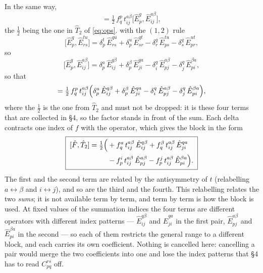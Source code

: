 \documentclass[11pt]{article}
\newcommand{\E}[2]{\hat E^{#1}_{#2}}
\newcommand{\occ}{i}
\newcommand{\vir}{a}
\begin{document}
In the same way,
\begin{equation}
  [\hat F,\hat T_2]
   =\tfrac12\,f^p_q\,t^{\vir\beta}_{\occ j}
     \bigl[\E{q}{p},\E{\vir\beta}{\occ j}\bigr],
\end{equation}
the $\tfrac12$ being the one in $\hat T_2$ of \eqref{eq:ops}.
with the $(1,2)$ rule
\begin{equation}
  \bigl[\E{q}{p},\E{tu}{rs}\bigr]
   =\delta^t_p\,\E{qu}{rs}+\delta^u_p\,\E{qt}{sr}
    -\delta^q_r\,\E{tu}{ps}-\delta^q_s\,\E{ut}{pr},
  \label{eq:c12}
\end{equation}
so
\[
  \bigl[\E{q}{p},\E{\vir\beta}{\occ j}\bigr]
   =\delta^\vir_p\,\E{q\beta}{\occ j}+\delta^\beta_p\,\E{q\vir}{j\occ}
    -\delta^q_\occ\,\E{\vir\beta}{pj}-\delta^q_j\,\E{\beta\vir}{p\occ},
\]
so that
\begin{equation}
  [\hat F,\hat T_2]
   =\tfrac12\,f^p_q\,t^{\vir\beta}_{\occ j}
     \Bigl(\delta^\vir_p\,\E{q\beta}{\occ j}+\delta^\beta_p\,\E{q\vir}{j\occ}
      -\delta^q_\occ\,\E{\vir\beta}{pj}-\delta^q_j\,\E{\beta\vir}{p\occ}\Bigr),
  \label{eq:c12apply}
\end{equation}
where the $\tfrac12$ is the one from $\hat T_2$ and must not be dropped: it is
these four terms that are collected in \S4, so the factor stands in front of
the sum. Each delta contracts one index of $f$ with the operator, which gives
the block in the form
\begin{equation}
  \boxed{\;
  \begin{aligned}
    [\hat F,\hat T_2]=\tfrac12\Bigl(
     &+f^\vir_q\,t^{\vir\beta}_{\occ j}\,\E{q\beta}{\occ j}
      +f^\beta_q\,t^{\vir\beta}_{\occ j}\,\E{q\vir}{j\occ}\\
     &-f^\occ_p\,t^{\vir\beta}_{\occ j}\,\E{\vir\beta}{pj}
      -f^j_p\,t^{\vir\beta}_{\occ j}\,\E{\beta\vir}{p\occ}\Bigr).
  \end{aligned}\;}
  \label{eq:FT2}
\end{equation}
The first and the second term are related by the antisymmetry of $t$
(relabelling $\vir\leftrightarrow\beta$ and $\occ\leftrightarrow j$), and so
are the third and the fourth. This relabelling relates the two \emph{sums}; it
is not available term by term, and term by term is how the block is used. At
fixed values of the summation indices the four terms are different operators
with different index patterns --- $\E{q\beta}{ij}$ and $\E{qa}{ji}$ in the first
pair, $\E{\vir\beta}{pj}$ and $\E{\beta\vir}{pi}$ in the second --- so each of
them restricts the general range to a different block, and each carries its own
coefficient. Nothing is cancelled here: cancelling a pair would merge the two
coefficients into one and lose the index patterns that \S4 has to read
$C^{rs}_{pq}$ off.
\end{document}
